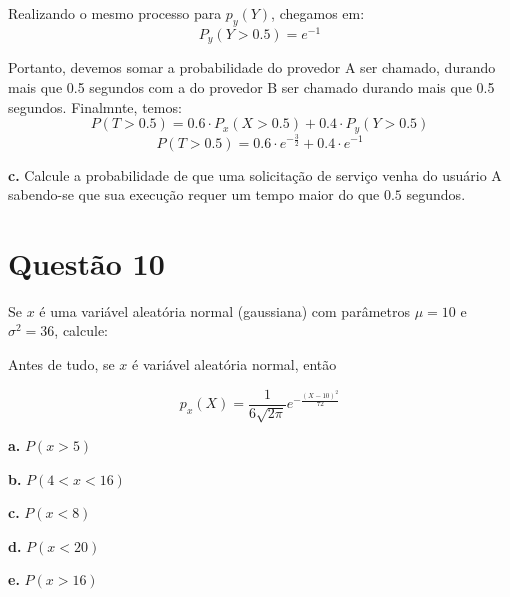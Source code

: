 \documentclass[a5paper]{report}
\begin{document}
Realizando o mesmo processo para $p_y(Y)$, chegamos em:
\[P_y(Y > 0.5) = e^{-1}\]

Portanto, devemos somar a probabilidade do provedor A ser chamado, durando mais que 0.5 segundos com a do provedor B ser chamado durando mais que 0.5 segundos. Finalmnte, temos:
\[P(T > 0.5) = 0.6 \cdot P_x(X > 0.5) + 0.4 \cdot P_y(Y > 0.5)\]
\[P(T > 0.5) = 0.6 \cdot e^{-\frac{3}{2}} + 0.4 \cdot e^{-1}\]

\textbf{c.} Calcule a probabilidade de que uma solicitação de serviço venha do usuário A sabendo-se que sua execução requer um tempo maior do que $0.5$ segundos.


\section*{Questão 10}
Se $x$ é uma variável aleatória normal (gaussiana) com parâmetros $\mu = 10$ e $\sigma^2 = 36$, calcule:

Antes de tudo, se $x$ é variável aleatória normal, então

\[p_x(X) = \frac{1}{6\sqrt{2\pi}} e^{-\frac{(X - 10)^2}{72}}\]

\textbf{a.} $P(x > 5)$

\textbf{b.} $P(4 < x< 16)$

\textbf{c.} $P(x < 8)$

\textbf{d.} $P(x < 20)$

\textbf{e.} $P(x > 16)$
	
\end{document}
